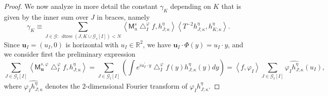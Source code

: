 \documentclass{amsart}%
\theoremstyle{plain}
\numberwithin{equation}{section}
\begin{document}
\begin{proof}
We now analyze in more detail the constant $\gamma_{K}$ depending on $K$ that
is given by the inner sum over $J$ in braces, namely%
\begin{equation}
\gamma_{K}\equiv\sum_{J\in\mathcal{G}:\ \operatorname*{dtree}\left(
J,K\cup\mathcal{G}_{s}\left[  I\right]  \right)  <N}\left\langle
\mathsf{M}_{u}^{s}\bigtriangleup_{I}^{\varphi}f,h_{J;\kappa}^{\eta
}\right\rangle \left\langle T^{-2}h_{J;\kappa}^{\eta},h_{K;\kappa}^{\eta
}\right\rangle .\label{inner sum}%
\end{equation}
Since $\mathbf{u}_{I}=\left(  u_{I},0\right)  $ is horizontal with $u_{I}%
\in\mathbb{R}^{2}$, we have $\mathbf{u}_{I}\cdot\Phi\left(  y\right)
=u_{I}\cdot y$, and we consider first the preliminary expression%
\begin{equation}
\sum_{J\in\mathcal{G}_{t}\left[  I\right]  }\left\langle \mathsf{M}%
_{\mathbf{u}}^{s,\varphi}\bigtriangleup_{I}^{\varphi}f,h_{J;\kappa}^{\eta
}\right\rangle =\sum_{J\in\mathcal{G}_{t}\left[  I\right]  }\left(  \int
e^{iu_{I}^{\prime}\cdot y}\bigtriangleup_{I}^{\varphi}f\left(  y\right)
h_{J;\kappa}^{\eta}\left(  y\right)  dy\right)  =\left\langle f,\varphi
_{I}\right\rangle \sum_{J\in\mathcal{G}_{t}\left[  I\right]  }\widehat
{\varphi_{I}h_{J;\kappa}^{\eta}}\left(  u_{I}\right)  ,\label{prelim}%
\end{equation}
where $\widehat{\varphi_{I}h_{J;\kappa}^{\eta}}$ denotes the $2$-dimensional
Fourier transform of $\varphi_{I}h_{J;\kappa}^{\eta}$.


\end{proof}
\end{document}
